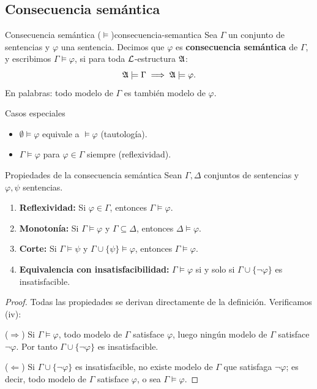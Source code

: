 \subsection{Consecuencia semántica}

\begin{definicion}{Consecuencia semántica ($\models$)}{consecuencia-semantica}
Sea $\Gamma$ un conjunto de sentencias y $\varphi$ una sentencia. Decimos que $\varphi$ es \textbf{consecuencia semántica} de $\Gamma$, y escribimos $\Gamma \models \varphi$, si para toda $\mathcal{L}$-estructura $\mathfrak{A}$:
\[
  \mathfrak{A} \models \Gamma \implies \mathfrak{A} \models \varphi.
\]
En palabras: todo modelo de $\Gamma$ es también modelo de $\varphi$.
\end{definicion}

\begin{observacion}{Casos especiales}{}
\begin{itemize}[leftmargin=2em]
  \item $\emptyset \models \varphi$ equivale a $\models \varphi$ (tautología).
  \item $\Gamma \models \varphi$ para $\varphi \in \Gamma$ siempre (reflexividad).
\end{itemize}
\end{observacion}

\begin{proposicion}{Propiedades de la consecuencia semántica}{}
Sean $\Gamma, \Delta$ conjuntos de sentencias y $\varphi, \psi$ sentencias.
\begin{enumerate}[leftmargin=2em, label=(\roman*)]
  \item \textbf{Reflexividad:} Si $\varphi \in \Gamma$, entonces $\Gamma \models \varphi$.
  \item \textbf{Monotonía:} Si $\Gamma \models \varphi$ y $\Gamma \subseteq \Delta$, entonces $\Delta \models \varphi$.
  \item \textbf{Corte:} Si $\Gamma \models \psi$ y $\Gamma \cup \{\psi\} \models \varphi$, entonces $\Gamma \models \varphi$.
  \item \textbf{Equivalencia con insatisfacibilidad:} $\Gamma \models \varphi$ si y solo si $\Gamma \cup \{\neg\varphi\}$ es insatisfacible.
\end{enumerate}
\end{proposicion}

\begin{proof}
Todas las propiedades se derivan directamente de la definición. Verificamos (iv):

($\Rightarrow$) Si $\Gamma \models \varphi$, todo modelo de $\Gamma$ satisface $\varphi$, luego ningún modelo de $\Gamma$ satisface $\neg\varphi$. Por tanto $\Gamma \cup \{\neg\varphi\}$ es insatisfacible.

($\Leftarrow$) Si $\Gamma \cup \{\neg\varphi\}$ es insatisfacible, no existe modelo de $\Gamma$ que satisfaga $\neg\varphi$; es decir, todo modelo de $\Gamma$ satisface $\varphi$, o sea $\Gamma \models \varphi$.
\end{proof}

